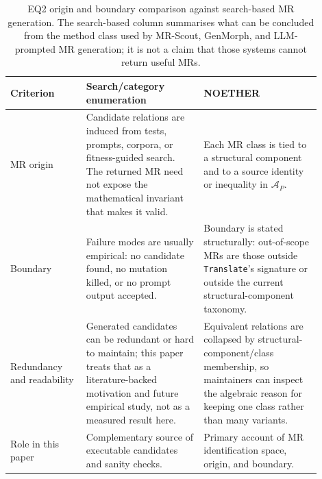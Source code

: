 \documentclass[acmsmall,screen,review]{acmart}
\begin{document}
\begin{table}[h]
\centering
\caption{EQ2 origin and boundary comparison against search-based MR generation.
The search-based column summarises what can be concluded from the method class
used by MR-Scout, GenMorph, and LLM-prompted MR generation; it is not a claim
that those systems cannot return useful MRs.}
\label{tab:search-origin-boundary}
\small
\begin{tabular}{p{0.22\linewidth}p{0.34\linewidth}p{0.34\linewidth}}
\toprule
Criterion & Search/category enumeration & NOETHER \\
\midrule
MR origin & Candidate relations are induced from tests, prompts, corpora, or
fitness-guided search. The returned MR need not expose the mathematical
invariant that makes it valid. & Each MR class is tied to a structural component and
to a source identity or inequality in $\mathcal{A}_P$. \\
Boundary & Failure modes are usually empirical: no candidate found, no mutation
killed, or no prompt output accepted. & Boundary is stated structurally:
out-of-scope MRs are those outside \texttt{Translate}'s signature or outside the
current structural-component taxonomy. \\
Redundancy and readability & Generated candidates can be redundant or hard to
maintain; this paper treats that as a literature-backed motivation and future
empirical study, not as a measured result here. & Equivalent relations are
collapsed by structural-component/class membership, so maintainers can inspect the algebraic
reason for keeping one class rather than many variants. \\
Role in this paper & Complementary source of executable candidates and sanity
checks. & Primary account of MR identification space, origin, and boundary. \\
\bottomrule
\end{tabular}
\end{table}
\end{document}
